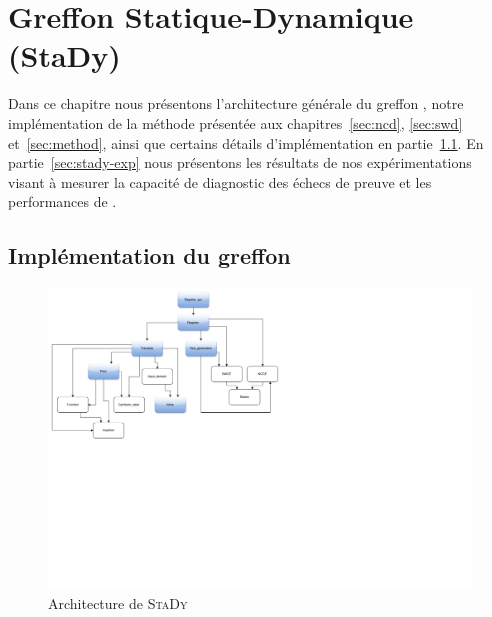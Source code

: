 
\chapter{Greffon Statique-Dynamique (StaDy)}
\label{sec:stady}

\chapterintro


Dans ce chapitre nous présentons l'architecture générale du greffon \stady,
notre implémentation de la méthode présentée aux chapitres~\ref{sec:ncd},
\ref{sec:swd} et~\ref{sec:method}, ainsi que certains détails d'implémentation
en partie~\ref{sec:stady-implem}.
En partie~\ref{sec:stady-exp} nous présentons les résultats de nos
expérimentations visant à mesurer la capacité de diagnostic des échecs de preuve
et les performances de \stady.


\section{Implémentation du greffon \stady}
\label{sec:stady-implem}


\begin{center}
  \begin{figure}[tb]
    \includegraphics[scale=.5]{figures/stady_architecture.pdf}
    \vspace{-11cm}
    \caption{Architecture de \textsc{StaDy}
      \label{fig:stady-architecture}}
  \end{figure}
\end{center}


